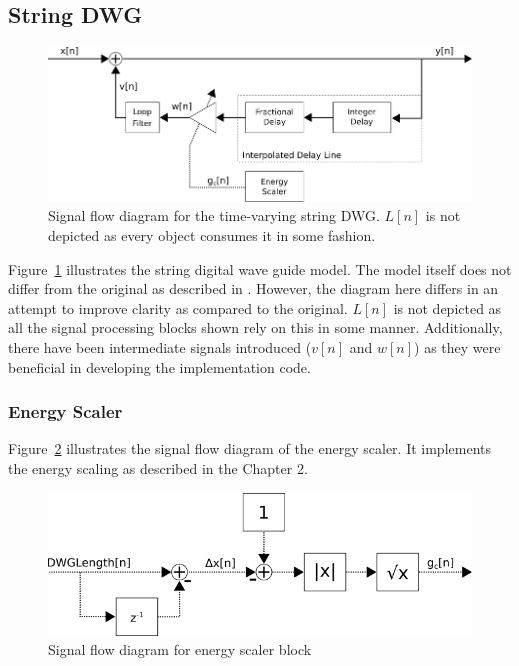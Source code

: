 \documentclass[../main.tex]{subfiles}
\begin{document}
\subsection{String DWG}

\begin{figure}[h]
    \centering
    \includegraphics[scale=.5]{./images/diagrams/stringDWG.png}
    \caption{Signal flow diagram for the time-varying string DWG. $L[n]$ is not depicted as every object consumes it in some fashion.}
    \label{fig:stringDWG}
\end{figure}

Figure~\ref{fig:stringDWG} illustrates the string digital wave guide model. The model itself does not differ from the original as described in . However, the diagram here differs in an attempt to improve clarity as compared to the original. $L[n]$ is not depicted as all the signal processing blocks shown rely on this in some manner. Additionally, there have been intermediate signals introduced ($v[n]$ and $w[n]$) as they were beneficial in developing the implementation code.

\subsubsection{Energy Scaler}
Figure~\ref{fig:energyScaler} illustrates the signal flow diagram of the energy scaler. It implements the energy scaling as described in the Chapter 2.
\begin{figure}[h]
    \centering
    \includegraphics[scale=.5]{./images/diagrams/energyScaler.png}
    \caption{Signal flow diagram for energy scaler block}
    \label{fig:energyScaler}
\end{figure}
\end{document}
